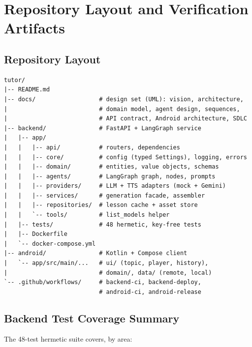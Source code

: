 \chapter{Repository Layout and Verification Artifacts}
\label{app:repo}

\section{Repository Layout}

\begin{lstlisting}[style=code]
tutor/
|-- README.md
|-- docs/                  # design set (UML): vision, architecture,
|                          # domain model, agent design, sequences,
|                          # API contract, Android architecture, SDLC
|-- backend/               # FastAPI + LangGraph service
|   |-- app/
|   |   |-- api/           # routers, dependencies
|   |   |-- core/          # config (typed Settings), logging, errors
|   |   |-- domain/        # entities, value objects, schemas
|   |   |-- agents/        # LangGraph graph, nodes, prompts
|   |   |-- providers/     # LLM + TTS adapters (mock + Gemini)
|   |   |-- services/      # generation facade, assembler
|   |   |-- repositories/  # lesson cache + asset store
|   |   `-- tools/         # list_models helper
|   |-- tests/             # 48 hermetic, key-free tests
|   |-- Dockerfile
|   `-- docker-compose.yml
|-- android/               # Kotlin + Compose client
|   `-- app/src/main/...   # ui/ (topic, player, history),
|                          # domain/, data/ (remote, local)
`-- .github/workflows/     # backend-ci, backend-deploy,
                           # android-ci, android-release
\end{lstlisting}

\section{Backend Test Coverage Summary}

The 48-test hermetic suite covers, by area:

